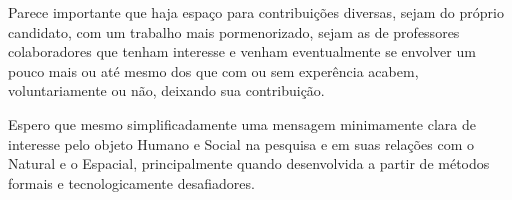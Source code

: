 \documentclass[
	12pt,				%
	openany,			%
	oneside,			%
	a4paper,			%
	english,			%
	french,				%
	spanish,			%
	brazil,				%
	]{abntex2}
\begin{document}
Parece importante que haja espaço para contribuições diversas, sejam do próprio candidato, com um trabalho mais pormenorizado, sejam as de professores colaboradores que tenham interesse e venham eventualmente se envolver um pouco mais ou até mesmo dos que com ou sem experência acabem, voluntariamente ou não, deixando sua contribuição.

Espero que mesmo simplificadamente uma mensagem minimamente clara de interesse pelo objeto Humano e Social na pesquisa e em suas relações com o Natural e o Espacial, principalmente quando desenvolvida a partir de métodos formais e tecnologicamente desafiadores.

\postextual


\end{document}
